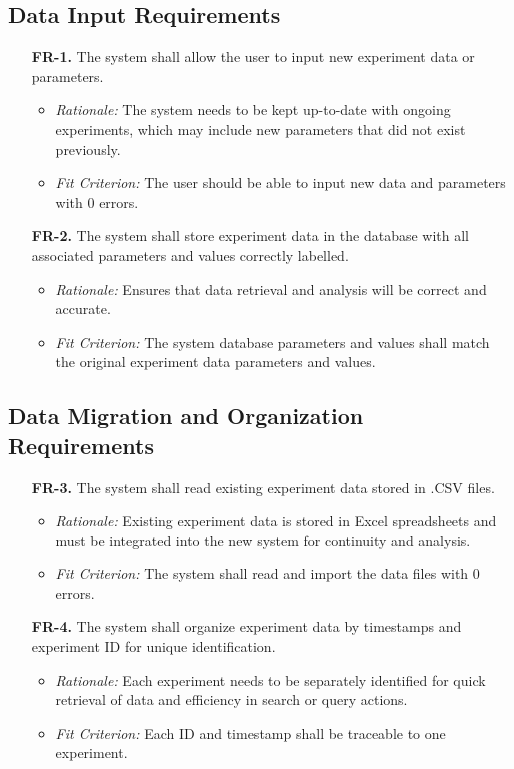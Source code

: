 \documentclass[12pt]{article}
\begin{document}
\subsection{Data Input Requirements}
  \begin{enumerate}
    \item[\textbf{FR-1.}] The system shall allow the user to input new
    experiment data or parameters.
    \begin{itemize}
    \item \textit{Rationale:} The system needs to be kept up-to-date with
    ongoing experiments, which may include new parameters that did not exist
    previously.
    \item \textit{Fit Criterion:} The user should be able to input new data and
    parameters with 0 errors.
    \end{itemize}
    \item[\textbf{FR-2.}] The system shall store experiment data in the database
    with all associated parameters and values correctly labelled.
    \begin{itemize}
      \item \textit{Rationale:} Ensures that data retrieval and analysis will be
      correct and accurate.
      \item \textit{Fit Criterion:} The system database parameters and values
      shall match the original experiment data parameters and values.
    \end{itemize}
  \end{enumerate}

\subsection{Data Migration and Organization Requirements}
  \begin{enumerate}
    \item[\textbf{FR-3.}] The system shall read existing experiment data stored
    in .CSV files.
    \begin{itemize}
      \item \textit{Rationale:} Existing experiment data is stored in Excel
      spreadsheets and must be integrated into the new system for continuity and
      analysis.
      \item \textit{Fit Criterion:} The system shall read and import the data
      files with 0 errors.
    \end{itemize}
    \item[\textbf{FR-4.}] The system shall organize experiment data by
    timestamps and experiment ID for unique identification.
    \begin{itemize}
      \item \textit{Rationale:} Each experiment needs to be separately
      identified for quick retrieval of data and efficiency in search or query
      actions.
      \item \textit{Fit Criterion:} Each ID and timestamp shall be traceable to
      one experiment.
    \end{itemize}
  \end{enumerate}
\end{document}
